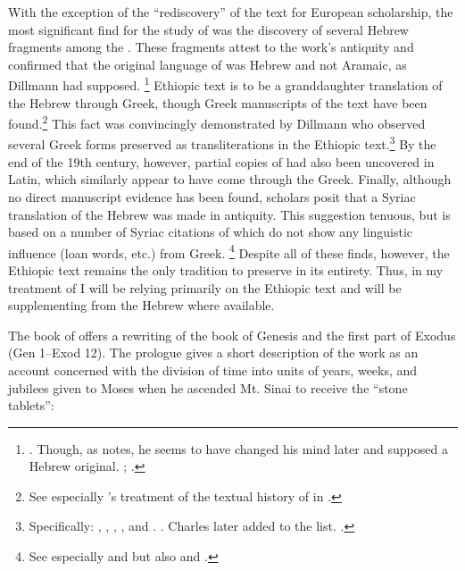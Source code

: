 With the exception of the ``rediscovery'' of the text for European scholarship, the most significant find for the study of \jub was the discovery of several Hebrew fragments among the \dss. These fragments  attest to the work's antiquity and confirmed that the original language of \jub was Hebrew and not Aramaic, as Dillmann had supposed.%
        \footnote{\cite[90]{dillamnn_jbw1850}. Though, as \vanderkam notes, he seems to have changed his mind later and supposed a Hebrew original. \cite[324]{dillmann_spaw1883}; \cite[1:1 n. 1]{vanderkam2018}.}
Ethiopic text is to be a granddaughter translation of the Hebrew through Greek, though Greek manuscripts of the text have been found.\footnote{See especially \vanderkam's treatment of the textual history of \jub in \cite*[1--18]{vanderkam1977}.} This fact was convincingly demonstrated by Dillmann who observed several Greek forms preserved as transliterations in the Ethiopic text.\footnote{Specifically: , , , , and . \cite[88]{dillamnn_jbw1850}. Charles later added  to the list. \cite[xxx]{charles1902}.} By the end of the 19th century, however, partial copies of \jub had also been uncovered in Latin, which similarly appear to have come through the Greek. Finally, although no direct manuscript evidence has been found, \jub scholars posit that a Syriac translation of the Hebrew was made in antiquity. This suggestion tenuous, but is based on a number of Syriac citations of \jub which do not show any linguistic influence (loan words, etc.) from Greek.%
        \footnote{%
                See especially
                \cite[231--232]{tisserant_rb1921} and 
                \cite[xxix]{charles1902} but also 
                \cite[2:ix--x]{ceriani1861} and 
                \cite[x]{charles1895}.}
Despite all of these finds, however, the Ethiopic text remains the only tradition to preserve \jub in its entirety. Thus, in my treatment of \jub I will be relying primarily on the Ethiopic text and will be supplementing from the Hebrew where available.

The book of \jub offers a rewriting of the book of Genesis and the first part of Exodus (Gen 1--Exod 12).\autocite[1:17]{vanderkam2018}  The prologue gives a short description of the work as an account concerned with the division of time into units of years, weeks, and jubilees given to Moses when he ascended Mt. Sinai to receive the ``stone tablets'':

